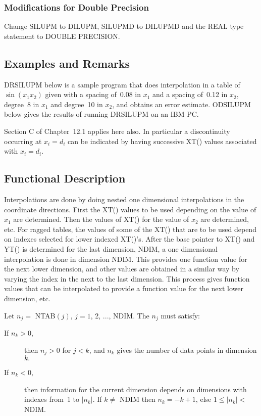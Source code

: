 \documentclass[twoside]{MATH77}
\begin{document}
\rule[-6.6in]{0pt}{8pt}

\subsubsection{Modifications for Double Precision}

Change SILUPM to DILUPM, SILUPMD to DILUPMD and the REAL type
statement to DOUBLE PRECISION.
\subsection{Examples and Remarks}

DRSILUPM below is a sample program that does interpolation in a table of $%
\sin (x_1x_2)$ given with a spacing of~0.08 in $x_1$ and a spacing of~0.12 in
$x_2$, degree~8 in $x_1$ and degree~10 in $x_2$, and obtains an error
estimate. ODSILUPM below gives the results of running DRSILUPM on an IBM PC.

Section C of Chapter~12.1 applies here also. In particular a
discontinuity occurring at $x_i = d_i$ can be indicated by having successive
XT() values associated with $x_i = d_i.$

\subsection{Functional Description}

Interpolations are done by doing nested one dimensional interpolations in
the coordinate directions. First the XT() values to be used depending on the
value of $x_1$ are determined. Then the values of XT() for the value of $x_2$
are determined, etc. For ragged tables, the values of some of the XT() that
are to be used depend on indexes selected for lower indexed XT()'s. After the
base pointer to XT() and YT() is determined for the last dimension, NDIM, a one
dimensional interpolation is done in dimension NDIM. This provides one
function value for the next lower dimension, and other values are obtained
in a similar way by varying the index in the next to the last dimension.
This process gives function values that can be interpolated to provide a
function value for the next lower dimension, etc.

Let $n_j =$ NTAB$(j)$, $j = 1$, 2, ..., NDIM. The $n_j$ must satisfy:

\begin{description}
\item[\rm If $n_k > 0,$]  then $n_j>0$ for $j<k$, and $n_k$ gives the number of
data points in dimension $k.$

\item[\rm If $n_k < 0,$]  then information for the current dimension depends on
dimensions with indexes from~1 to $|n_k|$. If $k\neq $ NDIM then $n_k=-k+1$,
else $1\leq |n_k|<$ NDIM.
\end{description}
\end{document}
